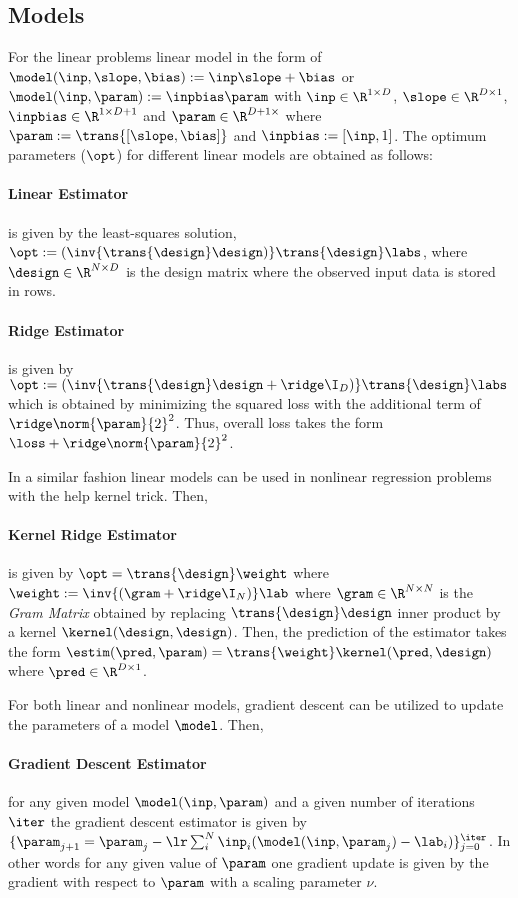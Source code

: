\subsection{Models} 

For the linear problems linear model in the form of $\model(\inp,\slope,\bias):=\inp\slope+\bias$ or $\model(\inp, \param):=\inpbias\param$ with $\inp\in\R^{1\times D}$, $\slope\in\R^{D\times 1}$, $\inpbias\in\R^{1\times D+1}$ and $\param\in\R^{D+1\times}$ where $\param:=\trans{[\slope, \bias]}$ and $\inpbias:=[\inp, 1]$. The optimum parameters ($\opt$) for different linear models are obtained as follows:

\paragraph{Linear Estimator} is given by the least-squares solution, $\opt:=(\inv{\trans{\design}\design)}\trans{\design}\labs$, where $\design\in\R^{N\times D}$ is the design matrix where the observed input data is stored in rows.

\paragraph{Ridge Estimator} is given by $\opt:=(\inv{\trans{\design}\design+\ridge \I_{D})}\trans{\design}\labs$ which is obtained by minimizing the squared loss with the additional term of $\ridge\norm{\param}{2}^2$. Thus, overall loss takes the form $\loss+\ridge\norm{\param}{2}^2$.

In a similar fashion linear models can be used in nonlinear regression problems with the help kernel trick. Then,

\paragraph{Kernel Ridge Estimator} is given by $\opt= \trans{\design}\weight$ where $\weight:=\inv{(\gram+\ridge\I_{N})}\lab$ where $\gram\in\R^{N\times N}$ is the  \textit{Gram Matrix} obtained by replacing $\trans{\design}\design$ inner product by a kernel $\kernel(\design, \design)$. Then, the prediction of the estimator takes the form $\estim(\pred,\param)=\trans{\weight}\kernel(\pred,\design)$ where $\pred\in\R^{D\times 1}$.

For both linear and nonlinear models, gradient descent can be utilized to update the parameters of a model $\model$. Then,

\paragraph{Gradient Descent Estimator} for any given model $\model(\inp, \param)$ and a given number of iterations $\iter$ the gradient descent estimator is given by $\{\param_{j+1}=\param_{j} - \lr\sum_i^{N}\inp_i(\model(\inp,\param_j)-\lab_i)\}_{j=0}^{\iter}$. In other words for any given value of $\param$ one gradient update is given by the gradient with respect to $\param$ with a scaling parameter $\nu$. 

